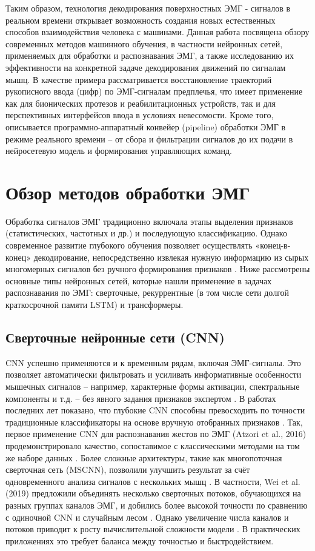 \documentclass[12pt,a4paper]{article}
\begin{document}
Таким образом, технология декодирования поверхностных ЭМГ - сигналов в реальном времени открывает возможность создания новых естественных способов взаимодействия человека с машинами. Данная работа посвящена обзору современных методов машинного обучения, в частности нейронных сетей, применяемых для обработки и распознавания ЭМГ, а также исследованию их эффективности на конкретной задаче декодирования движений по сигналам мышц. В качестве примера рассматривается восстановление траекторий рукописного ввода (цифр) по ЭМГ-сигналам предплечья, что имеет применение как для бионических протезов и реабилитационных устройств, так и для перспективных интерфейсов ввода в условиях невесомости. Кроме того, описывается программно-аппаратный конвейер (pipeline) обработки ЭМГ в режиме реального времени – от сбора и фильтрации сигналов до их подачи в нейросетевую модель и формирования управляющих команд. 

\section{Обзор методов обработки ЭМГ}
Обработка сигналов ЭМГ традиционно включала этапы выделения признаков (статистических, частотных и др.) и последующую классификацию. Однако современное развитие глубокого обучения позволяет осуществлять «конец-в-конец» декодирование, непосредственно извлекая нужную информацию из сырых многомерных сигналов без ручного формирования признаков \cite{8}. Ниже рассмотрены основные типы нейронных сетей, которые нашли применение в задачах распознавания по ЭМГ: сверточные, рекуррентные (в том числе сети долгой краткосрочной памяти LSTM) и трансформеры.

\subsection{Сверточные нейронные сети (CNN)}
CNN успешно применяются и к временным рядам, включая ЭМГ-сигналы. Это позволяет автоматически фильтровать и усиливать информативные особенности мышечных сигналов – например, характерные формы активации, спектральные компоненты и т.д. – без явного задания признаков экспертом \cite{9}. В работах последних лет показано, что глубокие CNN способны превосходить по точности традиционные классификаторы на основе вручную отобранных признаков \cite{10}. Так, первое применение CNN для распознавания жестов по ЭМГ (Atzori et al., 2016) продемонстрировало качество, сопоставимое с классическими методами на том же наборе данных \cite{11}. Более сложные архитектуры, такие как многопоточная сверточная сеть (MSCNN), позволили улучшить результат за счёт одновременного анализа сигналов с нескольких мышц \cite{12}. В частности, Wei et al. (2019) предложили объединять несколько сверточных потоков, обучающихся на разных группах каналов ЭМГ, и добились более высокой точности по сравнению с одиночной CNN и случайным лесом \cite{13}. Однако увеличение числа каналов и потоков приводит к росту вычислительной сложности модели \cite{14}. В практических приложениях это требует баланса между точностью и быстродействием.
\end{document}

